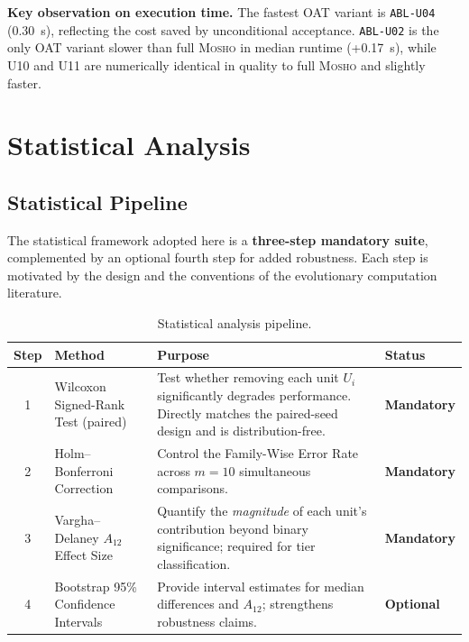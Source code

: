 \documentclass[11pt,a4paper]{article}
\newcommand{\mosho}{\textsc{Mosho}}
\newcommand{\ablof}[1]{\texttt{ABL-#1}}
\begin{document}
\noindent\textbf{Key observation on execution time.}
The fastest OAT variant is \ablof{U04} (0.30~s), reflecting the cost
saved by unconditional acceptance.  \ablof{U02} is the only OAT variant
slower than full \mosho{} in median runtime (+0.17~s), while U10 and U11
are numerically identical in quality to full \mosho{} and slightly faster.

\section{Statistical Analysis}
\label{sec:stat}

\subsection{Statistical Pipeline}
\label{sec:stat_pipeline}

The statistical framework adopted here is a \textbf{three-step mandatory
suite}, complemented by an optional fourth step for added robustness.
Each step is motivated by the design and the conventions of the
evolutionary computation literature.

\begin{table}[H]
\centering
\caption{Statistical analysis pipeline.}
\label{tab:pipeline}
\renewcommand{\arraystretch}{1.35}
\setlength{\tabcolsep}{6pt}
\small
\begin{tabular}{c l p{6.5cm} l}
\toprule
\textbf{Step} & \textbf{Method} & \textbf{Purpose} & \textbf{Status} \\
\midrule
1 & Wilcoxon Signed-Rank Test (paired)
  & Test whether removing each unit $U_i$ significantly degrades
    performance.  Directly matches the paired-seed design and is
    distribution-free.
  & \textbf{\textcolor{pipelinered}{Mandatory}} \\
2 & Holm--Bonferroni Correction
  & Control the Family-Wise Error Rate across $m=10$ simultaneous
    comparisons. 
  & \textbf{\textcolor{pipelineorange}{Mandatory}} \\
3 & Vargha--Delaney $A_{12}$ Effect Size
  & Quantify the \emph{magnitude} of each unit's contribution beyond
    binary significance; required for tier classification.
  & \textbf{\textcolor{pipelineyellow}{Mandatory}} \\
4 & Bootstrap 95\% Confidence Intervals
  & Provide interval estimates for median differences and $A_{12}$;
    strengthens robustness claims.
  & \textcolor{pipelinegreen}{\textbf{Optional}} \\
\bottomrule
\end{tabular}
\end{table}
\end{document}
